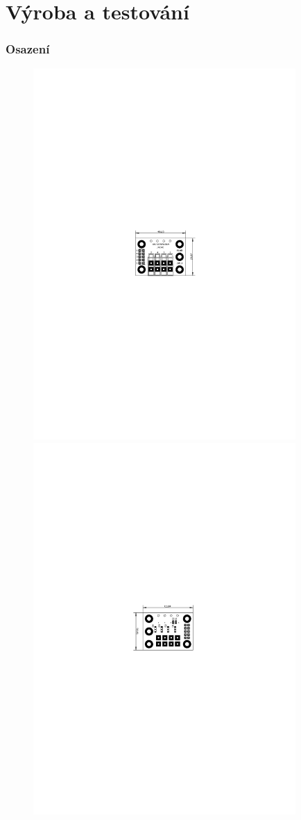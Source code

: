 \documentclass[12pt,a4paper,oneside]{article}
\begin{document}
\section{Výroba a testování}

\subsubsection{Osazení}

\begin{figure} [h!tbp]
  \centering
  \includegraphics[trim = 8.0cm 11.5cm 8.0cm 11.5cm, clip, width=10cm]{../../CAM_DOC/O1.pdf}
  \includegraphics[trim = 8.0cm 11.5cm 8.0cm 11.5cm, clip, width=10cm]{../../CAM_DOC/O2.pdf}

\end{figure}
\end{document}
